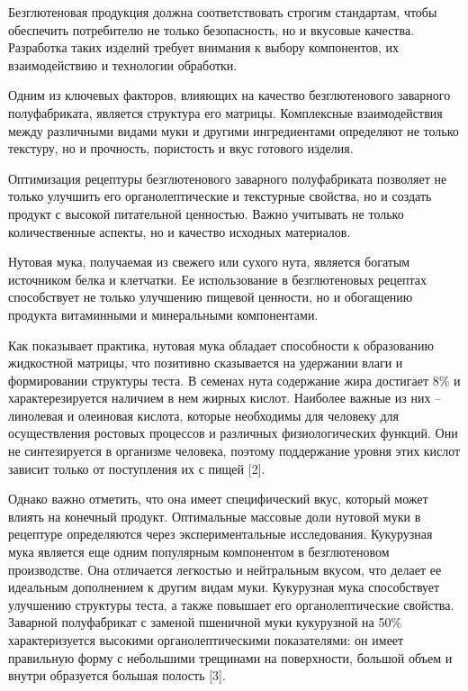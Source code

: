 Безглютеновая продукция должна соответствовать строгим стандартам, чтобы
обеспечить потребителю не только безопасность, но и вкусовые качества.
Разработка таких изделий требует внимания к выбору компонентов, их
взаимодействию и технологии обработки.

Одним из ключевых факторов, влияющих на качество безглютенового
заварного полуфабриката, является структура его матрицы. Комплексные
взаимодействия между различными видами муки и другими ингредиентами
определяют не только текстуру, но и прочность, пористость и вкус
готового изделия.

Оптимизация рецептуры безглютенового заварного полуфабриката позволяет
не только улучшить его органолептические и текстурные свойства, но и
создать продукт с высокой питательной ценностью. Важно учитывать не
только количественные аспекты, но и качество исходных материалов.

Нутовая мука, получаемая из свежего или сухого нута, является богатым
источником белка и клетчатки. Ее использование в безглютеновых рецептах
способствует не только улучшению пищевой ценности, но и обогащению
продукта витаминными и минеральными компонентами.

Как показывает практика, нутовая мука обладает способности к образованию
жидкостной матрицы, что позитивно сказывается на удержании влаги и
формировании структуры теста. В семенах нута содержание жира достигает
8\% и характерезируется наличием в нем жирных кислот. Наиболее важные из
них -- линолевая и олеиновая кислота, которые необходимы для человеку
для осуществления ростовых процессов и различных физиологических
функций. Они не синтезируется в организме человека, поэтому поддержание
уровня этих кислот зависит только от поступления их с пищей {[}2{]}.

Однако важно отметить, что она имеет специфический вкус, который может
влиять на конечный продукт. Оптимальные массовые доли нутовой муки в
рецептуре определяются через экспериментальные исследования. Кукурузная
мука является еще одним популярным компонентом в безглютеновом
производстве. Она отличается легкостью и нейтральным вкусом, что делает
ее идеальным дополнением к другим видам муки. Кукурузная мука
способствует улучшению структуры теста, а также повышает его
органолептические свойства. Заварной полуфабрикат с заменой пшеничной
муки кукурузной на 50\% характеризуется высокими органолептическими
показателями: он имеет правильную форму с небольшими трещинами на
поверхности, большой объем и внутри образуется большая полость {[}3{]}.

